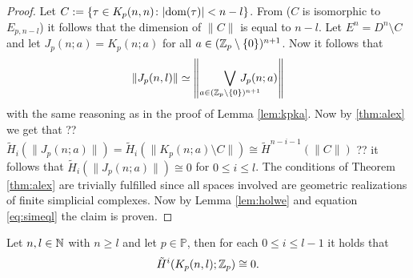 \begin{proof}
  Let $C := \{\tau \in K_p(n,n)\colon |{\rm dom}(\tau)| < n - l\}$. From \cite[p. 2513, Remark]{mc2002} ($C$ is isomorphic to $E_{p,n-l}$) it follows that the dimension of $\lVert C \rVert$ is equal to $n-l$.
  Let $E^n = D^n\setminus C$ and let $J_p(n;a) = K_p(n;a)$ for all $a \in (\mathbb{Z}_p\setminus \{0\})^{n+1}$. Now it follows that
  \begin{equation}\label{eq:simeql}
    \lVert J_p(n,l) \rVert \simeq \left\lVert \bigvee\limits_{a \in (\Z_p \setminus \{0\})^{n+1}} \hspace*{-20px}J_p(n;a) \right\rVert
  \end{equation}
  with the same reasoning as in the proof of Lemma \ref{lem:kpka}.
  Now by \ref{thm:alex} we get that ?? $\tilde{H}_i(\lVert J_p(n;a) \rVert) = \tilde{H}_i(\rVert K_p(n;a)\setminus C \rVert) \cong \tilde{H}^{n-i-1}(\lVert C\rVert)$ ?? it follows that $\tilde{H}_i(\lVert J_p(n;a) \rVert) \cong 0$ for $0 \leq i \leq l$. The conditions of Theorem \ref{thm:alex} are trivially fulfilled since all spaces involved are geometric realizations of finite simplicial complexes. Now by Lemma \ref{lem:holwe} and equation \ref{eq:simeql} the claim is proven. 
\end{proof}

\begin{lemma}\label{lem:knp}
  Let $n, l \in \mathbb{N}$ with $n \geq l$ and let $p \in \mathbb{P}$, then for each $0 \leq i \leq l-1$ it holds that
  \begin{equation*}
    \tilde{H}^i(K_p(n,l); \mathbb{Z}_p) \cong 0.
  \end{equation*}
\end{lemma}

